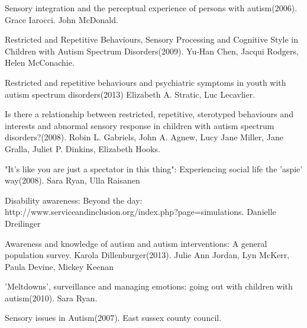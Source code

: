 \documentclass[11pt]{report}
\begin{document}
\begin{thebibliography}{9}
Sensory integration and the perceptual experience of persons with autism(2006). Grace Iarocci. John McDonald.

Restricted and Repetitive Behaviours, Sensory Processing and Cognitive Style in Children with Autism Spectrum Disorders(2009). Yu-Han Chen, Jacqui Rodgers, Helen McConachie.

Restricted and repetitive behaviours and psychiatric symptoms in youth with autism spectrum disorders(2013) Elizabeth A. Stratic, Luc Lecavlier.

Is there a relationship between restricted, repetitive, sterotyped behaviours and interests and abnormal sensory response in children with autism spectrum disorders?(2008). Robin L. Gabriels, John A. Agnew, Lucy Jane Miller, Jane Gralla, Juliet P. Dinkins, Elizabeth Hooks.

"It’s like you are just a spectator in this thing": Experiencing social life the 'aspie' way(2008). Sara Ryan, Ulla Raisanen

Disability awareness: Beyond the day: http://www.serviceandinclusion.org/index.php?page=simulations. Danielle Dreilinger

Awareness and knowledge of autism and autism interventions: A general population survey. Karola Dillenburger(2013). Julie Ann Jordan, Lyn McKerr, Paula Devine, Mickey Keenan

'Meltdowns', surveillance and managing emotions: going out with children with autism(2010). Sara Ryan.

Sensory issues in Autism(2007). East sussex county council. 

\end{thebibliography}
\end{document}
